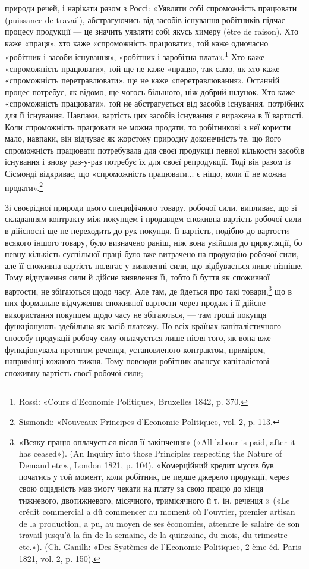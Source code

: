 природи речей, і нарікати разом з Россі: «Уявляти собі спроможність
працювати (puissance de travail), абстрагуючись від засобів
існування робітників підчас процесу продукції — це значить
уявляти собі якусь химеру (être de raison). Хто каже «праця»,
хто каже «спроможність працювати», той каже одночасно «робітник
і засоби існування», «робітник і заробітна плата».\footnote{
Rossi: «Cours d’Economie Politique», Bruxelles 1842, p. 370.
} Хто
каже «спроможність працювати», той ще не каже «праця», так
само, як хто каже «спроможність перетравлювати», ще не каже
«перетравлювання». Останній процес потребує, як відомо, ще
чогось більшого, ніж добрий шлунок. Хто каже «спроможність
працювати», той не абстрагується від засобів існування, потрібних
для її існування. Навпаки, вартість цих засобів існування
є виражена в її вартості. Коли спроможність працювати не можна
продати, то робітникові з неї користи мало, навпаки, він відчуває
як жорстоку природну доконечність те, що його спроможність
працювати потребувала для своєї продукції певної кількости засобів
існування і знову раз-у-раз потребує їх для своєї репродукції.
Тоді він разом із Сісмонді відкриває, що «спроможність
працювати... є ніщо, коли її не можна продати».\footnote{
Sismondi: «Nouveaux Principes d’Economie Politique», vol. 2, p. 113.
}

Зі своєрідної природи цього специфічного товару, робочої
сили, випливає, що зі складанням контракту між покупцем і
продавцем споживна вартість робочої сили в дійсності ще не
переходить до рук покупця. Її вартість, подібно до вартости
всякого іншого товару, було визначено раніш, ніж вона увійшла
до циркуляції, бо певну кількість суспільної праці було вже
витрачено на продукцію робочої сили, але її споживна вартість
полягає у виявленні сили, що відбувається лише пізніше. Тому
відчуження сили й дійсне виявлення її, тобто її буття як споживної
вартости, не збігаються щодо часу. Але там, де йдеться
про такі товари,\footnote{
«Всяку працю оплачується після її закінчення» («All labour is
paid, after it has ceased»). (An Inquiry into those Principles respecting
the Nature of Demand etc»., London 1821, p. 104). «Комерційний кредит
мусив був початись у той момент, коли робітник, це перше джерело продукції,
через свою ощадність мав змогу чекати на плату за свою працю
до кінця тижневого, двотижневого, місячного, тримісячного й т. ін. реченця
» («Le crédit commercial a dû commencer au moment où l’ouvrier,
premier artisan de la production, a pu, au moyen de ses économies, attendre
le salaire de son travail jusqu’à la fin de la semaine, de la quinzaine, du
mois, du trimestre etc.»). (Ch. Ganilh: «Des Systèmes de l’Economie
Politique», 2-ème éd. Paris 1821, vol. 2, p. 150).
} що в них формальне відчуження споживної
вартости через продаж і її дійсне використання покупцем щодо
часу не збігаються, — там гроші покупця функціонують здебільша
як засіб платежу. По всіх країнах капіталістичного способу
продукції робочу силу оплачується лише після того, як вона
вже функціонувала протягом реченця, установленого контрактом,
приміром, наприкінці кожного тижня. Тому повсюди робітник
авансує капіталістові споживну вартість своєї робочої сили;